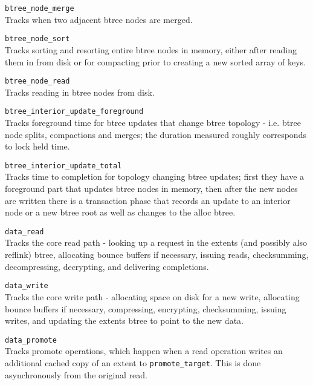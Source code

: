 \documentclass{article}
\begin{document}
\begin{description}
	\item \texttt{btree\_node\_merge} \\
		Tracks when two adjacent btree nodes are merged.

	\item \texttt{btree\_node\_sort} \\
		Tracks sorting and resorting entire btree nodes in memory,
		either after reading them in from disk or for compacting prior
		to creating a new sorted array of keys.

	\item \texttt{btree\_node\_read} \\
		Tracks reading in btree nodes from disk.

	\item \texttt{btree\_interior\_update\_foreground} \\
		Tracks foreground time for btree updates that change btree
		topology - i.e. btree node splits, compactions and merges; the
		duration measured roughly corresponds to lock held time.

	\item \texttt{btree\_interior\_update\_total} \\
		Tracks time to completion for topology changing btree updates;
		first they have a foreground part that updates btree nodes in
		memory, then after the new nodes are written there is a
		transaction phase that records an update to an interior node or
		a new btree root as well as changes to the alloc btree.

	\item \texttt{data\_read} \\
		Tracks the core read path - looking up a request in the extents
		(and possibly also reflink) btree, allocating bounce buffers if
		necessary, issuing reads, checksumming, decompressing, decrypting,
		and delivering completions.

	\item \texttt{data\_write} \\
		Tracks the core write path - allocating space on disk for a new
		write, allocating bounce buffers if necessary,
		compressing, encrypting, checksumming, issuing writes, and
		updating the extents btree to point to the new data.

	\item \texttt{data\_promote} \\
		Tracks promote operations, which happen when a read operation
		writes an additional cached copy of an extent to
		\texttt{promote\_target}. This is done asynchronously from the
		original read.


\end{description}
\end{document}
